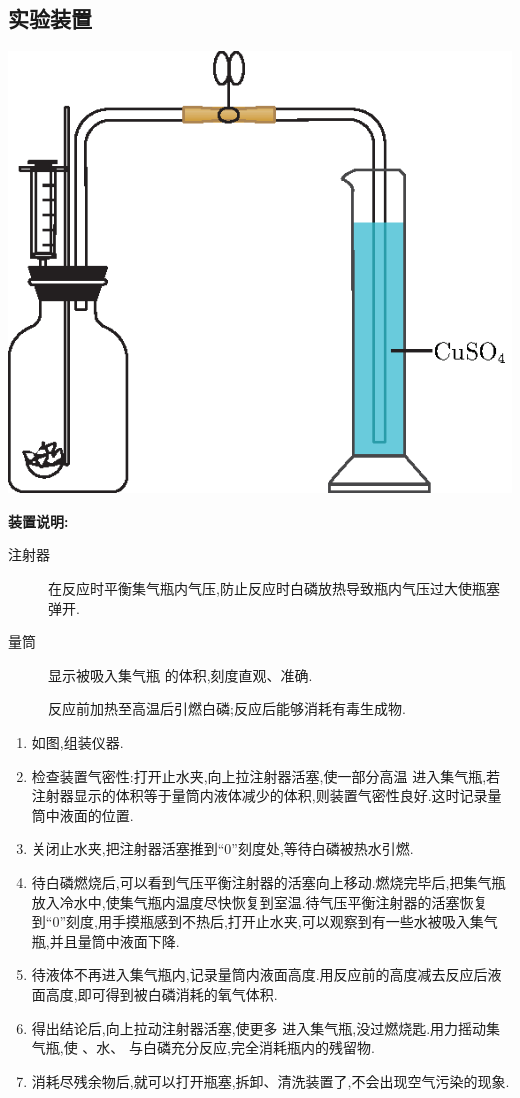 \documentclass[11pt,a4paper,titlepage,twocolumn]{ctexart}
\begin{document}
	\subsection{实验装置}
	
	\begin{center}
		\includegraphics[width=0.6\linewidth]{fig/6}
	\end{center}
	
	\noindent\textbf{装置说明:} \indent\par
	\begin{description}
		\item[注射器] 在反应时平衡集气瓶内气压,防止反应时白磷放热导致瓶内气压过大使瓶塞弹开.
		\item[量筒] 显示被吸入集气瓶 的体积,刻度直观、准确.
		\item[ ] 反应前加热至高温后引燃白磷;反应后能够消耗有毒生成物.
	\end{description}
	
	\begin{enumerate}
		\item 如图,组装仪器.
		\item 检查装置气密性:打开止水夹,向上拉注射器活塞,使一部分高温 进入集气瓶,若注射器显示的体积等于量筒内液体减少的体积,则装置气密性良好.这时记录量筒中液面的位置.
		\item 关闭止水夹,把注射器活塞推到``0''刻度处,等待白磷被热水引燃.
		\item 待白磷燃烧后,可以看到气压平衡注射器的活塞向上移动.燃烧完毕后,把集气瓶放入冷水中,使集气瓶内温度尽快恢复到室温.待气压平衡注射器的活塞恢复到``0''刻度,用手摸瓶感到不热后,打开止水夹,可以观察到有一些水被吸入集气瓶,并且量筒中液面下降.
		\item 待液体不再进入集气瓶内,记录量筒内液面高度.用反应前的高度减去反应后液面高度,即可得到被白磷消耗的氧气体积.
		\item 得出结论后,向上拉动注射器活塞,使更多 进入集气瓶,没过燃烧匙.用力摇动集气瓶,使 、水、 与白磷充分反应,完全消耗瓶内的残留物.
		\item 消耗尽残余物后,就可以打开瓶塞,拆卸、清洗装置了,不会出现空气污染的现象.
	\end{enumerate}
	
\end{document}
